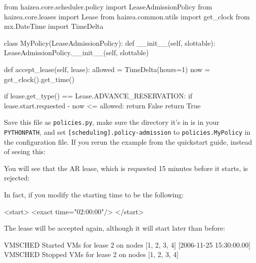 \begin{wideshellverbatim}
from haizea.core.scheduler.policy import LeaseAdmissionPolicy
from haizea.core.leases import Lease
from haizea.common.utils import get_clock
from mx.DateTime import TimeDelta

class MyPolicy(LeaseAdmissionPolicy):
    def __init__(self, slottable):
        LeaseAdmissionPolicy.__init__(self, slottable)
        
    def accept_lease(self, lease):
        allowed = TimeDelta(hours=1)
        now = get_clock().get_time()
        
        if lease.get_type() == Lease.ADVANCE_RESERVATION:
            if lease.start.requested - now <= allowed:
                return False
        return True
\end{wideshellverbatim}

Save this file as \texttt{policies.py}, make sure the directory it's in is in your \texttt{PYTHONPATH}, and set \texttt{[scheduling].policy-admission} to \texttt{policies.MyPolicy} in the configuration file. If you rerun the example from the quickstart guide, instead of seeing this:


You will see that the AR lease, which is requested 15 minutes before it starts, is rejected:


In fact, if you modify the starting time to be the following:

\begin{wideshellverbatim}
<start>
	<exact time="02:00:00"/>
</start>
\end{wideshellverbatim}

The lease will be accepted again, although it will start later than before:

\begin{wideshellverbatim}
[2006-11-25 15:00:00.00] VMSCHED Started VMs for lease 2 on nodes [1, 2, 3, 4]
[2006-11-25 15:30:00.00] VMSCHED Stopped VMs for lease 2 on nodes [1, 2, 3, 4]
\end{wideshellverbatim}

